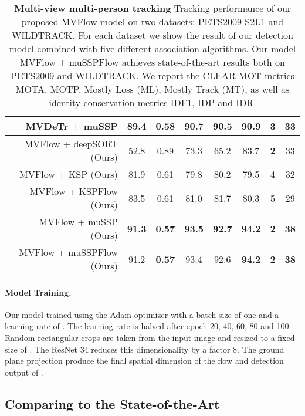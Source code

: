 \documentclass[10pt,twocolumn,letterpaper]{article}
\begin{document}
\begin{table*}[h]
\begin{center}
\begin{tabular}{r  c c c c c c c }
    MVDeTr \cite{hou2021multiview} + muSSP & 89.4 & 0.58 & 90.7 & 90.5 & 90.9 & 3 & 33 \\  
    \midrule
    MVFlow + deepSORT (Ours) & 52.8 & 0.89 & 73.3 & 65.2 & 83.7 & \textbf{2} & 33  \\
    MVFlow + KSP (Ours) & 81.9 & 0.61 & 79.8 & 80.2 & 79.5 & 4 & 32  \\
    MVFlow + KSPFlow (Ours) & 83.5 & 0.61 & 81.0 & 81.7 & 80.3 & 5 & 29  \\
    MVFlow + muSSP (Ours) & \textbf{91.3} & \textbf{0.57} & \textbf{93.5} & \textbf{92.7} & \textbf{94.2} & \textbf{2} & \textbf{38} \\
    MVFlow + muSSPFlow (Ours) & 91.2 & \textbf{0.57} & 93.4 & 92.6 & \textbf{94.2} & \textbf{2} & \textbf{38} \\
   


\bottomrule
    \end{tabular}
    \end{center}
      \caption{\textbf{Multi-view multi-person tracking} Tracking performance of our proposed MVFlow model
      on two datasets: PETS2009 S2L1 and WILDTRACK. For each dataset we show the result of our detection model combined with 
      five different association algorithms. Our model MVFlow + muSSPFlow achieves state-of-the-art results both on PETS2009 and WILDTRACK.
      We report the CLEAR MOT metrics MOTA, MOTP, Mostly Loss (ML), Mostly Track (MT), as well as identity conservation metrics IDF1, IDP and IDR.
      }  
     \label{tab:mvmtracking}
    \end{table*}

 
\paragraph{Model Training.}

Our model trained using the Adam optimizer \cite{Kingma15} with a batch size of one and a learning rate of . The learning rate is halved after epoch 20, 40, 60, 80 and 100. 
Random rectangular crops are taken from the input image and resized to a fixed-size of  . The ResNet 34 \cite{He16a} reduces this dimensionality by a factor 8.
The ground plane projection  produce the final spatial dimension of the flow and detection output of .

\subsection{Comparing to the State-of-the-Art}
\end{document}

